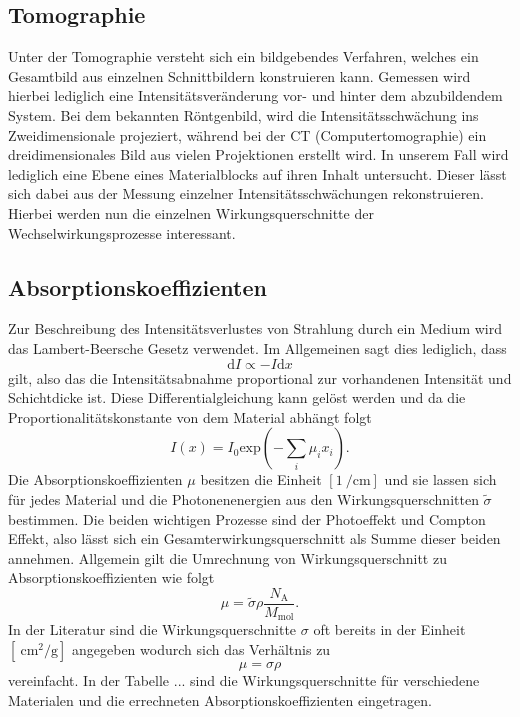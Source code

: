 \subsection{Tomographie}
Unter der Tomographie versteht sich ein bildgebendes Verfahren, welches ein Gesamtbild aus einzelnen Schnittbildern konstruieren kann. Gemessen wird hierbei
lediglich eine Intensitätsveränderung vor- und hinter dem abzubildendem System. 
Bei dem bekannten Röntgenbild, wird die Intensitätsschwächung ins Zweidimensionale projeziert, während bei der CT (Computertomographie) ein dreidimensionales Bild aus vielen Projektionen erstellt wird. 
In unserem Fall wird lediglich eine Ebene eines Materialblocks auf ihren Inhalt untersucht. Dieser lässt sich dabei aus der Messung einzelner Intensitätsschwächungen rekonstruieren. 
Hierbei werden nun die einzelnen Wirkungsquerschnitte der Wechselwirkungsprozesse interessant.
\subsection{Absorptionskoeffizienten}
Zur Beschreibung des Intensitätsverlustes von Strahlung durch ein Medium wird das Lambert-Beersche Gesetz verwendet. Im Allgemeinen sagt dies lediglich, dass
\begin{equation*}
\text{d}I \propto -I \text{d}x
\end{equation*}
gilt, also das die Intensitätsabnahme proportional zur vorhandenen Intensität und Schichtdicke ist. Diese Differentialgleichung kann gelöst werden und da die Proportionalitätskonstante von dem Material abhängt folgt
\begin{equation}
    \label{eqn:ayoo}
I(x) = I_0 \text{exp}\left(- \sum_{i}^{} \mu_i x_i \right).
\end{equation}
Die Absorptionskoeffizienten $\mu$ besitzen die Einheit $[\SI{1}{\per\centi\meter}]$ und sie lassen sich für jedes Material und die Photonenenergien aus den Wirkungsquerschnitten $\tilde{\sigma}$ bestimmen. Die beiden wichtigen Prozesse sind der Photoeffekt und Compton Effekt,
also lässt sich ein Gesamterwirkungsquerschnitt als Summe dieser beiden annehmen. Allgemein gilt die Umrechnung von Wirkungsquerschnitt zu Absorptionskoeffizienten wie folgt \cite{hier}
\begin{equation*}
\mu = \tilde{\sigma} \rho \frac{N_\text{A}}{M_{\text{mol}}}.
\end{equation*}
In der Literatur sind die Wirkungsquerschnitte $\sigma$ oft bereits in der Einheit $[\SI{}{\centi\meter\squared\per\gram}]$ angegeben wodurch sich das Verhältnis zu 
\begin{equation*}
\mu = \sigma \rho
\end{equation*}
vereinfacht. In der Tabelle ... sind die Wirkungsquerschnitte für verschiedene Materialen \cite{wqs} und die errechneten Absorptionskoeffizienten eingetragen. 
